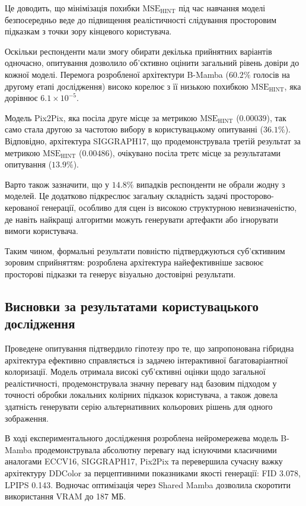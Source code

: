             Це доводить, що мінімізація похибки $\mathrm{MSE}_{\mathrm{HINT}}$ під час навчання моделі безпосередньо веде до підвищення реалістичності слідування просторовим підказкам з точки зору кінцевого користувача.

            Оскільки респонденти мали змогу обирати декілька прийнятних варіантів одночасно, опитування дозволило об'єктивно оцінити загальний рівень довіри до кожної моделі.
            Перемога розробленої архітектури B-Mamba ($60.2\%$ голосів на другому етапі дослідження) високо корелює з її низькою похибкою $\mathrm{MSE}_{\mathrm{HINT}}$, яка дорівнює $6.1 \times 10^{-5}$. 
            
            Модель Pix2Pix, яка посіла друге місце за метрикою $\mathrm{MSE}_{\mathrm{HINT}}$ ($0.00039$), так само стала другою за частотою вибору в користувацькому опитуванні ($36.1\%$).
            Відповідно, архітектура SIGGRAPH17, що продемонструвала третій результат за метрикою $\mathrm{MSE}_{\mathrm{HINT}}$ ($0.00486$), очікувано посіла третє місце за результатами опитування ($13.9\%$).

            Варто також зазначити, що у $14.8\%$ випадків респонденти не обрали жодну з моделей.
            Це додатково підкреслює загальну складність задачі просторово-керованої генерації,
            особливо для сцен із високою структурною невизначеністю,
            де навіть найкращі алгоритми можуть генерувати артефакти або ігнорувати вимоги користувача.

            Таким чином, формальні результати повністю підтверджуються суб'єктивним зоровим сприйняттям:
            розроблена архітектура найефективніше засвоює просторові підказки та генерує візуально достовірні результати.

        \subsection{Висновки за результатами користувацького дослідження}
            Проведене опитування підтвердило гіпотезу про те,
            що запропонована гібридна архітектура ефективно справляється із задачею інтерактивної багатоваріантної колоризації.
            Модель отримала високі суб'єктивні оцінки щодо загальної реалістичності,
            продемонструвала значну перевагу над базовим підходом у точності обробки локальних колірних підказок користувача,
            а також довела здатність генерувати серію альтернативних кольорових рішень для одного зображення.

\chapconclude{\ref{chap:results}}
    В ході експериментального дослідження розроблена нейромережева модель B-Mamba
    продемонструвала абсолютну перевагу над існуючими класичними аналогами ECCV16, SIGGRAPH17, Pix2Pix
    та перевершила сучасну важку архітектуру DDColor за перцептивними показниками якості генерації: FID 3.078, LPIPS 0.143.
    Водночас оптимізація через Shared Mamba дозволила скоротити використання $\mathrm{VRAM}$ до 187 МБ. 

